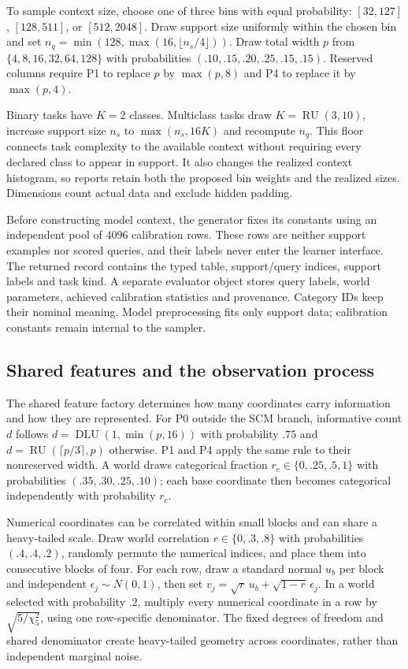\documentclass[11pt]{article}
\begin{document}
To sample context size, choose one of three bins with equal probability: $[32,127]$, $[128,511]$, or $[512,2048]$. Draw support size uniformly within the chosen bin and set $n_q=\min(128,\max(16,\lfloor n_s/4\rfloor))$. Draw total width $p$ from $\{4,8,16,32,64,128\}$ with probabilities $(.10,.15,.20,.25,.15,.15)$. Reserved columns require P1 to replace $p$ by $\max(p,8)$ and P4 to replace it by $\max(p,4)$.

Binary tasks have $K=2$ classes. Multiclass tasks draw $K=\operatorname{RU}(3,10)$, increase support size $n_s$ to $\max(n_s,16K)$ and recompute $n_q$. This floor connects task complexity to the available context without requiring every declared class to appear in support. It also changes the realized context histogram, so reports retain both the proposed bin weights and the realized sizes. Dimensions count actual data and exclude hidden padding.

Before constructing model context, the generator fixes its constants using an independent pool of $4096$ calibration rows. These rows are neither support examples nor scored queries, and their labels never enter the learner interface. The returned record contains the typed table, support/query indices, support labels and task kind. A separate evaluator object stores query labels, world parameters, achieved calibration statistics and provenance. Category IDs keep their nominal meaning. Model preprocessing fits only support data; calibration constants remain internal to the sampler.

\subsection{Shared features and the observation process}

The shared feature factory determines how many coordinates carry information and how they are represented. For P0 outside the SCM branch, informative count $d$ follows $d=\operatorname{DLU}(1,\min(p,16))$ with probability $.75$ and $d=\operatorname{RU}(\lceil p/3\rceil,p)$ otherwise. P1 and P4 apply the same rule to their nonreserved width. A world draws categorical fraction $r_c\in\{0,.25,.5,1\}$ with probabilities $(.35,.30,.25,.10)$; each base coordinate then becomes categorical independently with probability $r_c$.

Numerical coordinates can be correlated within small blocks and can share a heavy-tailed scale. Draw world correlation $r\in\{0,.3,.8\}$ with probabilities $(.4,.4,.2)$, randomly permute the numerical indices, and place them into consecutive blocks of four. For each row, draw a standard normal $u_b$ per block and independent $\epsilon_j\sim N(0,1)$, then set $v_j=\sqrt r\,u_b+\sqrt{1-r}\,\epsilon_j$. In a world selected with probability $.2$, multiply every numerical coordinate in a row by $\sqrt{5/\chi^2_5}$, using one row-specific denominator. The fixed degrees of freedom and shared denominator create heavy-tailed geometry across coordinates, rather than independent marginal noise.
\end{document}
